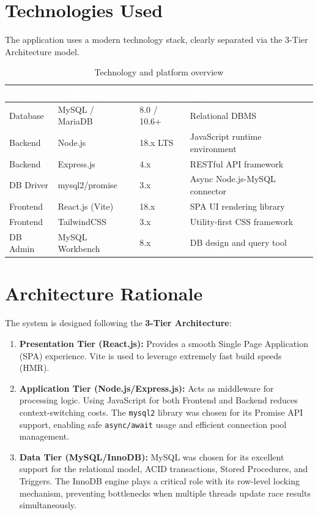 \documentclass[12pt, a4paper]{report}
\begin{document}
\clearpage
\section{Technologies Used}
The application uses a modern technology stack, clearly separated via the 3-Tier Architecture model.

\begin{table}[h]
\centering
\caption{Technology and platform overview}
\begin{tabularx}{\textwidth}{L{2.5cm} L{4.5cm} L{2.5cm} L{4.8cm}}
\toprule
{}
\textcolor{white}{\textbf{Tier}} & \textcolor{white}{\textbf{Technology}} & \textcolor{white}{\textbf{Version}} & \textcolor{white}{\textbf{Role}} \\
\midrule
Database    & MySQL / MariaDB         & 8.0 / 10.6+ & Relational DBMS \\
Backend     & Node.js                 & 18.x LTS    & JavaScript runtime environment \\
Backend     & Express.js              & 4.x         & RESTful API framework \\
DB Driver   & mysql2/promise          & 3.x         & Async Node.js-MySQL connector \\
Frontend    & React.js (Vite)         & 18.x        & SPA UI rendering library \\
Frontend    & TailwindCSS             & 3.x         & Utility-first CSS framework \\
DB Admin    & MySQL Workbench         & 8.x         & DB design and query tool \\
\bottomrule
\end{tabularx}
\end{table}

\section{Architecture Rationale}
The system is designed following the \textbf{3-Tier Architecture}:

\begin{enumerate}
    \item \textbf{Presentation Tier (React.js):} Provides a smooth Single Page Application (SPA) experience. Vite is used to leverage extremely fast build speeds (HMR).
    \item \textbf{Application Tier (Node.js/Express.js):} Acts as middleware for processing logic. Using JavaScript for both Frontend and Backend reduces context-switching costs. The \texttt{mysql2} library was chosen for its Promise API support, enabling safe \texttt{async/await} usage and efficient connection pool management.
    \item \textbf{Data Tier (MySQL/InnoDB):} MySQL was chosen for its excellent support for the relational model, ACID transactions, Stored Procedures, and Triggers. The InnoDB engine plays a critical role with its row-level locking mechanism, preventing bottlenecks when multiple threads update race results simultaneously.
\end{enumerate}
\end{document}
